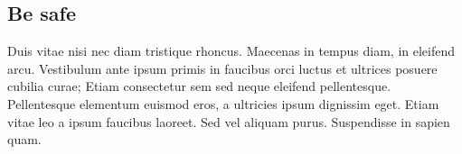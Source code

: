 \subsection{Be safe}

 Duis vitae nisi nec diam tristique rhoncus. Maecenas in tempus diam, in eleifend arcu. Vestibulum ante ipsum primis in faucibus orci luctus et ultrices posuere cubilia curae; Etiam consectetur sem sed neque eleifend pellentesque. Pellentesque elementum euismod eros, a ultricies ipsum dignissim eget. Etiam vitae leo a ipsum faucibus laoreet. Sed vel aliquam purus. Suspendisse in sapien quam.
 
\clearpage
